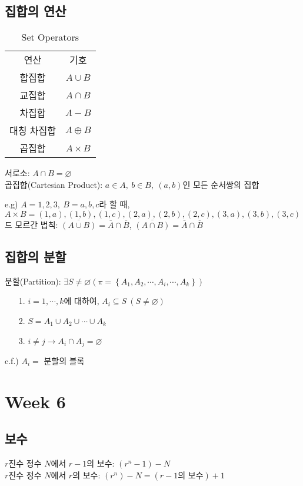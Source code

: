 \subsection{집합의 연산}
\begin{table}[]
    \caption {Set Operators}
    \centering
    \begin{tabular}{c|c}
    연산      & 기호\\
    \Xhline{3\arrayrulewidth}
    합집합  & $A \cup B$\\
    \hline
    교집합 & $A \cap B$\\
    \hline
    차집합 &$A-B$\\
    \hline
    대칭 차집합&$A\oplus B$\\
    \hline
    곱집합&$A\times B$
    \end{tabular}
\end{table}$$$$
서로소: $A \cap B = \varnothing$\\
곱집합(Cartesian Product): $a\in A,\ b \in B,\ (a, b)$인 모든 순서쌍의 집합

e.g) $A={1, 2, 3},\ B={a, b, c}$라 할 때, $A\times B = {(1, a), (1, b), (1, c), (2, a), (2, b), (2, c), (3, a), (3, b), (3, c)}$\\
드 모르간 법칙: $\overline{(A\cup B)} = \overline{A} \cap \overline{B}$, $\overline{(A \cap B)} = \overline{A} \cap \overline{B}$

\subsection{집합의 분할}
분할(Partition): $\exists S \neq \varnothing (\pi = \left\{A_1, A_2, \cdots, A_i, \cdots, A_k\right\})$
\begin{itemize}
    \item[1.] $i=1, \cdots, k$에 대하여, $A_i \subseteq S\ (S \neq \varnothing)$
    \item[2.] $S=A_1\cup A_2\cup \cdots \cup A_k$
    \item[3.] $i\neq j \to A_i \cap A_j = \varnothing$
\end{itemize}

c.f.) $A_i = $ 분할의 블록

\section{Week 6}
\subsection{보수}
$r$진수 정수 $N$에서 $r-1$의 보수: $(r^n-1) - N$\\
$r$진수 정수 $N$에서 $r$의 보수: $(r^n) - N = (r-1\text{의 보수}) + 1$

